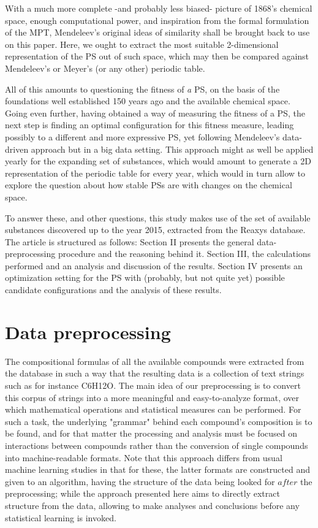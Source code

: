 \documentclass[]{article}
\begin{document}
With a much more complete -and probably less biased- picture of 1868's chemical space, enough computational power, and inspiration from the formal formulation of the MPT, Mendeleev's original ideas of similarity shall be brought back to use on this paper. Here, we ought to extract the most suitable 2-dimensional representation of the PS out of such space, which may then be compared against Mendeleev's or Meyer's (or any other) periodic table. 

All of this amounts to questioning the fitness of \textit{a} PS, on the basis of the foundations well established 150 years ago and the available chemical space. Going even further, having obtained a way of measuring the fitness of a PS, the next step is finding an optimal configuration for this fitness measure, leading possibly to a different and more expressive PS, yet following Mendeleev's data-driven approach but in a big data setting. This approach might as well be applied yearly for the expanding set of substances, which would amount to generate a 2D representation of the periodic table for every year, which would in turn allow to explore the question about how stable PSs are with changes on the chemical space.

To answer these, and other questions, this study makes use of the set of available substances discovered up to the year 2015, extracted from the Reaxys database. The article is structured as follows: Section II presents the general data-preprocessing procedure and the reasoning behind it. Section III, the calculations performed and an analysis and discussion of the results. Section IV presents an optimization setting for the PS with (probably, but not quite yet) possible candidate configurations and the analysis of these results.

\section{Data preprocessing}
\label{sec:sec2}

The compositional formulas of all the available compounds were extracted from the database in such a way that the resulting data is a collection of text strings such as for instance C6H12O. The main idea of our preprocessing is to convert this corpus of strings into a more meaningful and easy-to-analyze format, over which mathematical operations and statistical measures can be performed. For such a task, the underlying "grammar" behind each compound's composition is to be found, and for that matter the processing and analysis must be focused on interactions between compounds rather than the conversion of single compounds into machine-readable formats. Note that this approach differs from usual machine learning studies in that for these, the latter formats are constructed and given to an algorithm, having the structure of the data being looked for $\textit{after}$ the preprocessing; while the  approach presented here aims to directly extract structure from the data, allowing to make analyses and conclusions before any statistical learning is invoked.\\
\end{document}
